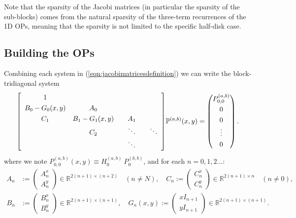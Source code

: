 \documentclass[11pt, oneside]{article}   	%
\newcommand{\R}{\mathbb{R}}
\newcommand{\bigP}{\mathbb{P}}
\newcommand{\bigPab}{\bigP^{(a,b)}}
\begin{document}
Note that the sparsity of the Jacobi matrices (in particular the sparsity of the sub-blocks) comes from the natural sparsity of the three-term recurrences of the 1D OPs, meaning that the sparsity is not limited to the specific half-disk case.




\subsection{Building the OPs} 

Combining each system in (\ref{eqn:jacobimatricesdefinition}) we can write the block-tridiagonal system
\begin{align}
\renewcommand\arraystretch{1.3}
\mleft[
\begin{array}{cccc}
		1 & & & \\
		B_0-G_0(x,y) & A_0 & & \\
		C_1 & B_1-G_1(x,y) & \quad A_1 \quad & \\
		& C_2 & \ddots & \ddots \\
		& & \ddots &
\end{array}
\mright]
\bigPab(x,y)
=
\begin{pmatrix}
	P^{(a,b)}_{0,0} \\ 0 \\ 0 \\ \vdots \\ 0 \\
\end{pmatrix}.
\end{align}
where we note \(P^{(a,b)}_{0,0}(x,y) \equiv H_0^{(a,b)} \: P_0^{(b,b)}\), and for each $n = 0,1,2\dots$:
\begin{align}
A_n &:= \begin{pmatrix}
		A^x_n \\
		A^y_n
	    \end{pmatrix} \in \R^{2(n+1)\times(n+2)} \quad (n \ne N), \quad
C_n := \begin{pmatrix}
		C^x_n \\
		C^y_n
	    \end{pmatrix} \in \R^{2(n+1)\times n} \quad (n \ne 0), \nonumber \\
B_n &:= \begin{pmatrix}
		B^x_n \\
		B^y_n
	    \end{pmatrix} \in \R^{2(n+1)\times(n+1)}, \quad
G_n(x,y) := \begin{pmatrix}
		xI_{n+1} \\
		yI_{n+1}
	    \end{pmatrix} \in \R^{2(n+1)\times(n+1)}.
\end{align}
 
\end{document}
